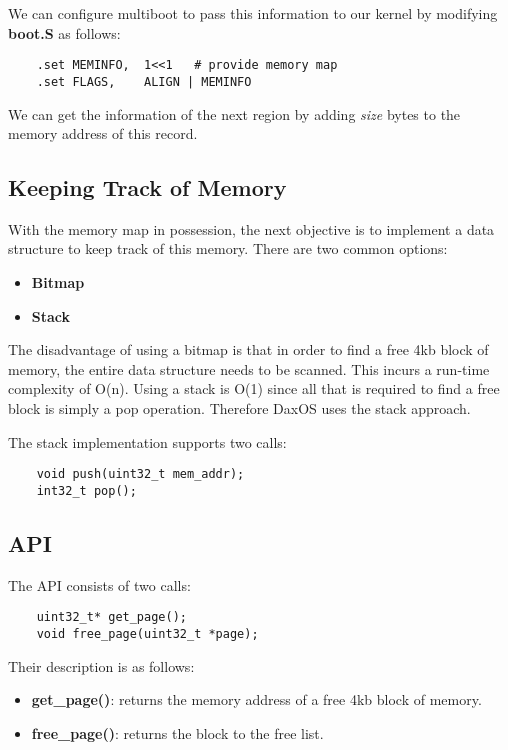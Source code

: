 We can configure multiboot to pass this information to our kernel by modifying \textbf{boot.S} as follows:
\vspace{0.5cm}
\begin{lstlisting}
    .set MEMINFO,  1<<1   # provide memory map
    .set FLAGS,    ALIGN | MEMINFO
\end{lstlisting}
\vspace{0.5cm}

We can get the information of the next region by adding \textit{size} bytes to the memory address of this record.

\pagebreak
\subsection{Keeping Track of Memory}\label{subsection:Keeping Track of Memory}

With the memory map in possession, the next objective is to implement a data structure to keep track of this memory.
There are two common options:
\begin{itemize}
    \item \textbf{Bitmap}
    \item \textbf{Stack}
\end{itemize}

The disadvantage of using a bitmap is that in order to find a free 4kb block of memory, the entire data structure needs
to be scanned. This incurs a run-time complexity of O(n).
Using a stack is O(1) since all that is required to find a free block is simply a pop operation.
Therefore DaxOS uses the stack approach.

\vspace{1cm}
The stack implementation supports two calls:
\begin{lstlisting}
    void push(uint32_t mem_addr);
    int32_t pop();
\end{lstlisting}

\subsection{API}\label{subsection:API}
The API consists of two calls:
\vspace{0.3cm}
\begin{lstlisting}
    uint32_t* get_page();
    void free_page(uint32_t *page);
\end{lstlisting}
Their description is as follows:
\begin{itemize}
    \item \textbf{get\_page()}: returns the memory address of a free 4kb block of memory.
    \item \textbf{free\_page()}: returns the block to the free list.
\end{itemize}
\pagebreak

